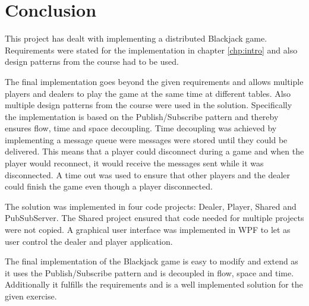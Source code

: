 \chapter{Conclusion}
This project has dealt with implementing a distributed Blackjack game. Requirements were stated for the implementation in chapter \ref{chp:intro} and also design patterns from the course had to be used.

The final implementation goes beyond the given requirements and allows multiple players and dealers to play the game at the same time at different tables. Also multiple design patterns from the course were used in the solution. Specifically the implementation is based on the Publish/Subscribe pattern and thereby ensures flow, time and space decoupling. Time decoupling was achieved by implementing a message queue were messages were stored until they could be delivered. This means that a player could disconnect during a game and when the player would reconnect, it would receive the messages sent while it was disconnected. A time out was used to ensure that other players and the dealer could finish the game even though a player disconnected.

The solution was implemented in four code projects: Dealer, Player, Shared and PubSubServer. The Shared project ensured that code needed for multiple projects were not copied. A graphical user interface was implemented in WPF to let as user control the dealer and player application.  

The final implementation of the Blackjack game is easy to modify and extend as it uses the Publish/Subscribe pattern and is decoupled in flow, space and time. Additionally it fulfills the requirements and is a well implemented solution for the given exercise.